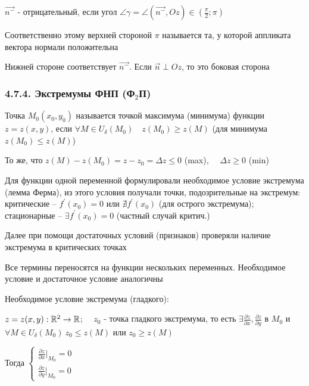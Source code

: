 \documentclass[12pt]{article}
\begin{document}
    $\vec{n^-}$ - отрицательный, если угол $\angle\gamma = \angle (\overrightarrow{n^-}, Oz) \in \left(\frac{\pi}{2}; \pi\right)$

    Соответственно этому верхней стороной $\pi$ называется та, у которой аппликата вектора нормали положительна

    Нижней стороне соответствует $\overrightarrow{n^-}$. Если $\overrightarrow{n} \perp Oz$, то это боковая сторона

    \subsubsection{4.7.4. Экстремумы ФНП (Ф$_2$П)}

    \hypertarget{extremumsoffunctions}{}

    \Def Точка $M_0(x_0, y_0)$ называется точкой максимума (минимума) функции $z = z(x, y)$, если $\forall M \in U_\delta (M_0) \quad z(M_0) \geq z(M)$ (для минимума $z(M_0) \leq z(M)$)

    \Nota То же, что $z(M) - z(M_0) = z - z_0 = \Delta z \leq 0$ (max), $\quad \Delta z \geq 0$ (min)

    \Mem Для функции одной переменной формулировали необходимое условие экстремума (лемма Ферма), из этого условия получали точки, подозрительные на экстремум: критические -- $f^\prime(x_0) = 0$ или $\nexists f^\prime(x_0)$ (для острого экстремума); стационарные -- $\exists f^\prime(x_0) = 0$ (частный случай критич.)

    Далее при помощи достаточных условий (признаков) проверяли наличие экстремума в критических точках

    \Nota Все термины переносятся на функции нескольких переменных. 
    Необходимое условие и достаточное условие аналогичны

    \hypertarget{extremumnecessarycondition}{}

    \begin{MyTheorem}
        \Ths Необходимое условие экстремума (гладкого):

        $z = z(x, y) : \mathbb{R}^2 \rightarrow \mathbb{R}$; $\quad z_0$ - точка гладкого экстремума,
        то есть $\exists \frac{\partial z}{\partial x}, \frac{\partial z}{\partial y}$ в $M_0$ и $\forall M \in U_\delta(M_0) \ z_0 \leq z(M)$ или $z_0 \geq z(M)$

        Тогда $\begin{cases}\frac{\partial z}{\partial x} \Big|_{M_0} = 0 \\ \frac{\partial z}{\partial y} \Big|_{M_0} = 0\end{cases}$
    \end{MyTheorem}
\end{document}
